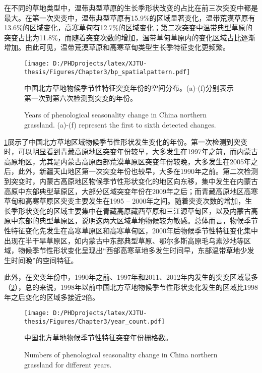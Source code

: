 在不同的草地类型中，温带典型草原的生长季形状改变的占比在前三次突变中都是最大。在第一次突变中，温带典型草原有15.9\%的区域显著变化，温带荒漠草原有13.6\%的区域变化，高寒草甸有12.7\%的区域变化；第二次突变中温带典型草原的突变占比为11.8\%，而随着突变次数的增加，温带草甸草原内的变化区域占比逐渐增加。由此可见，温带荒漠草原和高寒草甸类型生长季特征变化更频繁。

\begin{figure}[h]
  \centering
  \texttt{[image: D:/PHDprojects/latex/XJTU-thesis/Figures/Chapter3/bp\_spatialpattern.pdf]}
  \caption{中国北方草地物候季节性特征突变年份的空间分布。(a)-(f)分别表示第一次到第六次检测到突变的年份。}
  \addtocounter{figure}{-1}
  \vspace{5pt}
  \renewcommand{\figurename}{Fig}
  \caption{Years of phenological seasonality change in China northern grassland. (a)-(f) represent the first to sixth detected changes.}
  \label{figure44}
\end{figure}

\cref{figure44}展示了中国北方草地区域物候季节性形状发生变化的年份。第一次检测到突变时，可以明显看到青藏高原地区突变年份较早，大多发生在1997年之前，而内蒙古高原地区，尤其是内蒙古高原西部荒漠草原区突变年份较晚，大多发生在2005年之后，此外，新疆天山地区第一次突变年份也较早，大多在1990年之前。第二次检测到突变时，内蒙古高原地区物候季节性形状变化的地区向东移，集中发生在内蒙古高原中东部典型草原区，大部分区域突变年份在2009年之后；而青藏高原地区高寒草甸和高寒草原区突变主要发生在1995 – 2000年之间。随着突变次数的增加，生长季形状变化的区域主要集中在青藏高原藏西草原和三江源草甸区，以及内蒙古高原中东部的典型草原区，说明这两大区域草地物候较为敏感。总体而言，物候季节性特征变化先发生在高寒草原区和高寒草甸区，2000年后物候季节性特征变化集中出现在半干旱草原区，如内蒙古中东部典型草原、鄂尔多斯高原毛乌素沙地等区域，物候季节性形状变化呈现出“西部高寒草地多发生时间早，东部温带草地少发生时间晚”的空间特征。

此外，在突变年份中，1990年之前、1997年和2011、2012年内发生的突变区域最多（\cref{figure45}），总的来说，1998年以前中国北方草地物候季节性形状变化发生的区域比1998年之后变化的区域多接近2倍。

\begin{figure}[h]
  \centering
  \texttt{[image: D:/PHDprojects/latex/XJTU-thesis/Figures/Chapter3/year\_count.pdf]}
  \caption{中国北方草地物候季节性特征突变年份栅格数。}
  \addtocounter{figure}{-1}
  \vspace{5pt}
  \renewcommand{\figurename}{Fig}
  \caption{Numbers of phenological seasonality change in China northern grassland for different years.}
  \label{figure45}
\end{figure}

